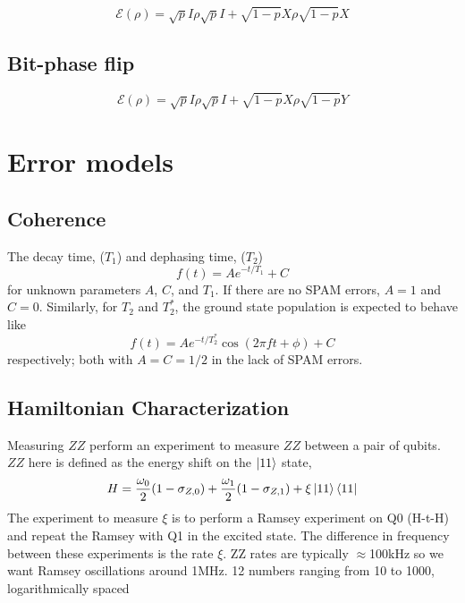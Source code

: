 \documentclass[11pt, oneside]{article}   	%
\begin{document}
\begin{equation}
\mathcal{E} (\rho) = \sqrt{p} I \rho  \sqrt{p} I + \sqrt{1-p} X  \rho \sqrt{1-p} X 
\end{equation}

\subsection{Bit-phase flip}
\begin{equation}
\mathcal{E} (\rho) = \sqrt{p} I \rho  \sqrt{p} I + \sqrt{1-p} X  \rho \sqrt{1-p} Y
\end{equation}

\section{Error models}
\subsection{Coherence}
The decay time,  ($T_1$) and dephasing time,  ($T_2$) 
\begin{equation}
f(t) = A e^{- t/T_1} + C
\end{equation}
for unknown parameters $A$, $C$, and $T_1$. 
If there are no SPAM errors,  $A = 1$ and $C = 0$.
Similarly, for $T_2$ and $T^*_2$,  the ground state population is expected to behave like
\begin{equation}
f(t) = A e^{- t/T^*_2} \cos( 2\pi f t + \phi ) + C
\end{equation}
respectively; both with $A = C = 1/2$ in the lack of SPAM errors.

\subsection{Hamiltonian Characterization}
Measuring $ZZ$
perform an experiment to measure $ZZ$ between a pair of qubits. 
$ZZ$ here is defined as the energy shift on the $\ket{11}$ state,
\begin{equation}
H = \frac{\omega_0}{2} (1 - \sigma_{Z, 0}) + \frac{\omega_1}{2} (1 - \sigma_{Z, 1}) + \xi \ket{11} \bra{11}
\end{equation}
The experiment to measure $\xi$ is to perform a Ramsey experiment on Q0 (H-t-H) and repeat the Ramsey with Q1 in the excited state. 
The difference in frequency between these experiments is the rate $\xi$. 
ZZ rates are typically $\approx$100kHz so we want Ramsey oscillations around 1MHz.
12 numbers ranging from 10 to 1000, logarithmically spaced
\end{document}
